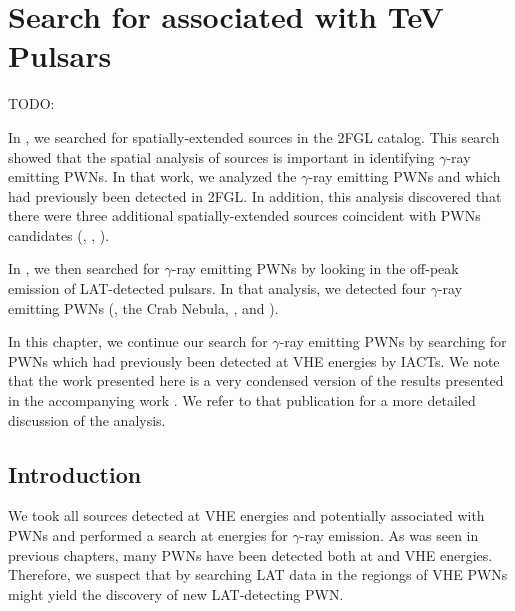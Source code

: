 \chapter{Search for  associated with TeV Pulsars}


TODO:

In , we searched for spatially-extended sources
in the 2FGL catalog.  This search showed that the spatial analysis of
\fermi sources is important in identifying $\gamma$-ray emitting \acp{PWN}.
In that work, we analyzed the $\gamma$-ray emitting \acp{PWN} 
and \mshfifteenfiftytwo which had previously been detected in \ac{2FGL}.
In addition, this analysis discovered that there were three additional
spatially-extended \fermi sources coincident with \acp{PWN} candidates
(, , ).

In , we then searched for $\gamma$-ray emitting \acp{PWN}
by looking in the off-peak emission of \ac{LAT}-detected
pulsars. In that analysis, we detected four $\gamma$-ray emitting \acp{PWN}
(\velax, the Crab Nebula, \mshfifteenfiftytwo, and \threecfiftyeight).

In this chapter, we continue our search for $\gamma$-ray emitting
\acp{PWN} by searching for \acp{PWN} which had previously been detected
at \ac{VHE} energies by \acp{IACT}. We note that the work presented here is a
very condensed version of the results presented in the accompanying work
\citep{acero_2013a_constraints-galactic}.  We refer to that publication
for a more detailed discussion of the analysis.

\section{Introduction}

We took all sources detected at \ac{VHE} energies and potentially associated
with \acp{PWN} and performed a search at \gev energies for $\gamma$-ray
emission. As was seen in previous chapters, many \acp{PWN} have been
detected both at \gev and \ac{VHE} energies. Therefore, we suspect that by
searching \ac{LAT} data in the regiongs of \ac{VHE} \acp{PWN} might yield
the discovery of new LAT-detecting \ac{PWN}.


